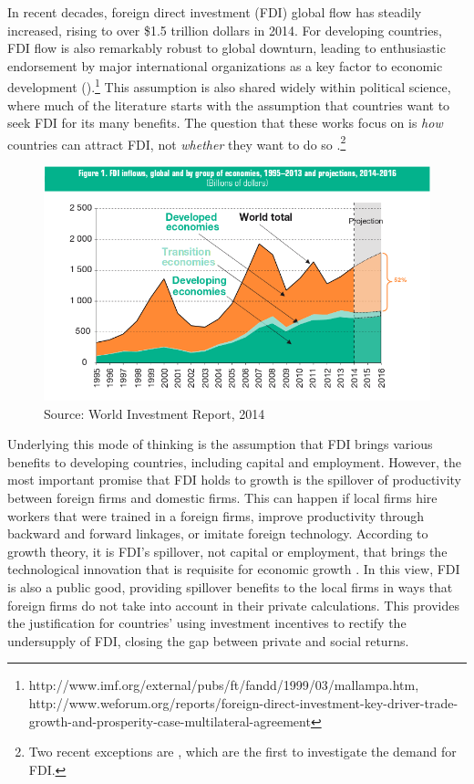 In recent decades, foreign direct investment (FDI) global flow has steadily increased, rising to over \$1.5 trillion dollars in 2014. For developing countries, FDI flow is also remarkably robust to global downturn, leading to enthusiastic endorsement by major international organizations as a key factor to economic development ().\footnote{http://www.imf.org/external/pubs/ft/fandd/1999/03/mallampa.htm, http://www.weforum.org/reports/foreign-direct-investment-key-driver-trade-growth-and-prosperity-case-multilateral-agreement} This assumption is also shared widely within political science, where much of the literature starts with the assumption that countries want to seek FDI for its many benefits. The question that these works focus on is \textit{how} countries can attract FDI, not \textit{whether} they want to do so \citep{Jensen2003, Li2003, Li2006, Ahlquist2006}.\footnote{Two recent exceptions are \citet{Pinto2013, Pandya2013}, which are the first to investigate the demand for FDI.} 

\begin{figure}[!ht]
\includegraphics[width=\textwidth, height=\textheight,keepaspectratio]{../figure/global_fdi}
\caption{Source: World Investment Report, 2014}
\label{fig:globalfdi}
\end{figure}

Underlying this mode of thinking is the assumption that FDI brings various benefits to developing countries, including capital and employment. However, the most important promise that FDI holds to growth is the spillover of productivity between foreign firms and domestic firms. This can happen if local firms hire workers that were trained in a foreign firms, improve productivity through backward and forward linkages, or imitate foreign technology. According to growth theory, it is FDI's spillover, not capital or employment, that brings the technological innovation that is requisite for economic growth \citep{Findlay1978}. In this view, FDI is also a public good, providing spillover benefits to the local firms in ways that foreign firms do not take into account in their private calculations. This provides the justification for countries' using investment incentives to rectify the undersupply of FDI, closing the gap between private and social returns. 

